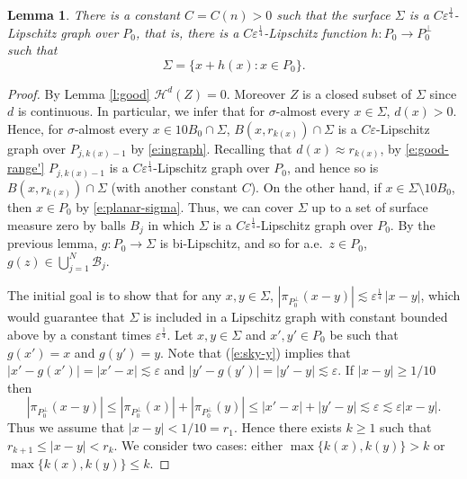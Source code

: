 \documentclass[11pt]{amsart}
\newcommand{\rf}[1]{{(\ref{#1})}}
\newcommand{\ve}{{\varepsilon}}
\newtheorem{lemma}[theorem]{Lemma}
\theoremstyle{definition}
\theoremstyle{remark}
\numberwithin{equation}{section}
\def\cH{{\mathcal{H}}}
\def\lec{\lesssim}
\def\lec{\lesssim}
\begin{document}
\begin{lemma}\label{lem6.8}
	There is a constant $C=C(n)>0$ such that the surface $\Sigma$ is a $C\ve^{\frac14}$-Lipschitz graph over $P_{0}$, that is, there is a $C\ve^{\frac14}$-Lipschitz function $h:P_{0}\rightarrow P_{0}^{\perp}$ such that 
	\begin{equation}\label{S-graph}
	\Sigma = \{x+h(x):x\in P_{0}\}.
	\end{equation}
\end{lemma}
\begin{proof}
By Lemma \ref{l:good} $\cH^{d}(Z)=0$. Moreover $Z$ is a closed subset of $\Sigma$ since 
$d$ is continuous. In particular, we infer that for $\sigma$-almost every $x\in \Sigma$, $d(x)>0$. Hence, for $\sigma$-almost every $x\in 10B_{0}\cap \Sigma$, $B(x,r_{k(x)})\cap \Sigma$ is a $C\ve$-Lipschitz graph over $P_{j,k(x)-1}$ by \eqref{e:ingraph}. Recalling that $d(x)\approx r_{k(x)}$, by 
 \eqref{e:good-range'}  $P_{j,k(x)-1}$ is 
 a $C\ve^{\frac14}$-Lipschitz graph over $P_{0}$, and hence so is $B(x,r_{k(x)})\cap \Sigma$ (with another constant $C$). On the other hand, if $x\in \Sigma\setminus 10B_{0}$, then $x\in P_{0}$ by \eqref{e:planar-sigma}.  Thus, we can cover $\Sigma$ up 
 to a set of surface measure zero by balls $B_j$ in which $\Sigma$ is a $C\ve^{\frac14}$-Lipschitz graph over $P_{0}$. 
 By the previous lemma, $g:P_{0}\rightarrow \Sigma$ is bi-Lipschitz, and so for a.e.\ $z\in P_{0}$, $g(z)\in \bigcup_{j=1}^N \mathcal{B}_j$. 
 
 {%
 The initial goal is to show that for any $x,y\in \Sigma$, $|\pi_{P_{0}^{\perp}}(x-y)|\lec \ve^{\frac14}\,|x-y|$, which would guarantee that $\Sigma$ is included in a Lipschitz graph with constant bounded above by a constant times $ \ve^{\frac14}$. Let  $x,y\in \Sigma$ and $x', y'\in P_0$ be such that $g(x')=x$ and $g(y')=y$. Note that \rf{e:sky-y} implies that $|x'-g(x')|=|x'-x|\lec\ve$ and $|y'-g(y')|=|y'-y|\lec \ve$. If $|x-y|\ge 1/10$
 then
 \begin{equation}\label{x-y-big}
 |\pi_{P_{0}^{\perp}}(x-y)|\le |\pi_{P_{0}^{\perp}}(x)|+|\pi_{P_0^{\perp}}(y)|\le |x'-x| +|y'-y|\lec \ve\lec\ve|x-y|. 
 \end{equation}
 Thus we assume that $|x-y|< 1/10=r_1$. Hence there exists $k\ge1$ such that $r_{k+1}\le |x-y|<r_k$. We consider two cases: either $\max\{k(x),k(y)\}>k$ or $\max\{k(x),k(y)\}\le k$. 
 
}
\end{proof}
\end{document}
